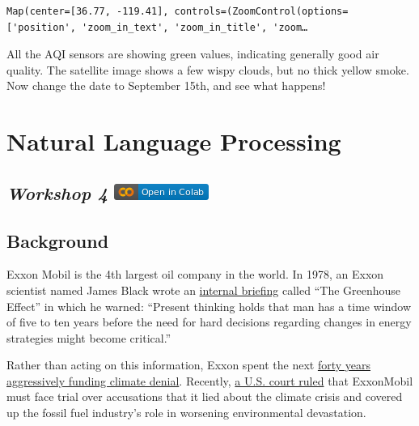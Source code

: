 \documentclass[
  letterpaper,
  DIV=11,
  numbers=noendperiod]{scrreprt}
\begin{document}
\begin{verbatim}
Map(center=[36.77, -119.41], controls=(ZoomControl(options=['position', 'zoom_in_text', 'zoom_in_title', 'zoom…
\end{verbatim}

All the AQI sensors are showing green values, indicating generally good
air quality. The satellite image shows a few wispy clouds, but no thick
yellow smoke. Now change the date to September 15th, and see what
happens!


\hypertarget{natural-language-processing}{%
\chapter{Natural Language
Processing}\label{natural-language-processing}}

\hypertarget{workshop-4-open-in-colab}{%
\section[\emph{Workshop 4} ]{\texorpdfstring{\emph{Workshop 4}
\href{https://colab.research.google.com/github/oballinger/QM2/blob/main/notebooks/W04.\%20Natural\%20Language\%20Processing.ipynb}{\protect\includegraphics{index_files/mediabag/colab-badge.png}}}{Workshop 4 Open In Colab}}\label{workshop-4-open-in-colab}}

\hypertarget{background-1}{%
\section{Background}\label{background-1}}

Exxon Mobil is the 4th largest oil company in the world. In 1978, an
Exxon scientist named James Black wrote an
\href{https://insideclimatenews.org/documents/james-black-1977-presentation/}{internal
briefing} called ``The Greenhouse Effect'' in which he warned: ``Present
thinking holds that man has a time window of five to ten years before
the need for hard decisions regarding changes in energy strategies might
become critical.''

Rather than acting on this information, Exxon spent the next
\href{https://news.harvard.edu/gazette/story/2021/09/oil-companies-discourage-climate-action-study-says/}{forty
years aggressively funding climate denial}. Recently,
\href{https://www.theguardian.com/environment/2022/may/24/exxon-trial-climate-crimes-fossil-fuels-global-heating}{a
U.S. court ruled} that ExxonMobil must face trial over accusations that
it lied about the climate crisis and covered up the fossil fuel
industry's role in worsening environmental devastation.
\end{document}
